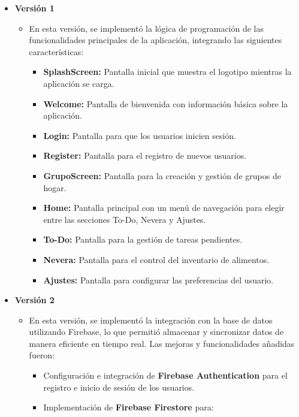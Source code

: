 \documentclass{article}
\begin{document}
\begin{flushleft}
\begin{itemize}
    
    \item \textbf{Versión 1} 
        \begin{itemize}
        \item  En esta versión, se implementó la lógica de programación de las funcionalidades principales de la aplicación, integrando las siguientes características:
  
\begin{itemize}
    \item \textbf{SplashScreen:} Pantalla inicial que muestra el logotipo mientras la aplicación se carga.
    \item \textbf{Welcome:} Pantalla de bienvenida con información básica sobre la aplicación.
    \item \textbf{Login:} Pantalla para que los usuarios inicien sesión.
    \item \textbf{Register:} Pantalla para el registro de nuevos usuarios.
    \item \textbf{GrupoScreen:} Pantalla para la creación y gestión de grupos de hogar.
        \item \textbf{Home:} Pantalla principal con un menú de navegación para elegir entre las secciones To-Do, Nevera y Ajustes.

    \item \textbf{To-Do:} Pantalla para la gestión de tareas pendientes.
    \item \textbf{Nevera:} Pantalla para el control del inventario de alimentos.
    \item \textbf{Ajustes:} Pantalla para configurar las preferencias del usuario.
\end{itemize}
\end{itemize}
    
    \item \textbf{Versión 2} 
        \begin{itemize}
\item En esta versión, se implementó la integración con la base de datos utilizando Firebase, lo que permitió almacenar y sincronizar datos de manera eficiente en tiempo real. Las mejoras y funcionalidades añadidas fueron:\\
 \begin{itemize}
    \item Configuración e integración de \textbf{Firebase Authentication} para el registro e inicio de sesión de los usuarios.
    \item Implementación de \textbf{Firebase Firestore} para:
                \begin{itemize}
                

\end{itemize}
\end{itemize}
\end{itemize}
\end{itemize}
\end{flushleft}
\end{document}

